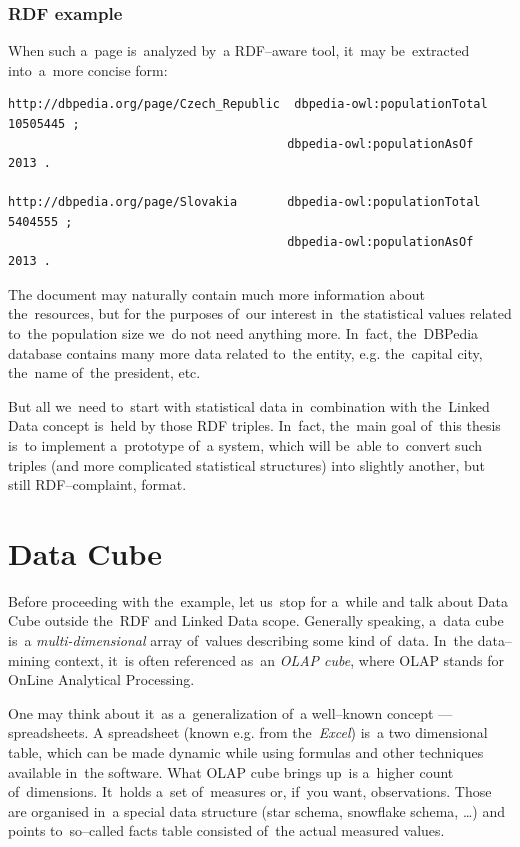 \subsubsection{RDF example}

When such a~page is~analyzed by~a RDF--aware tool, it~may be~extracted into~a~more concise form:

\scriptsize\begin{verbatim}
http://dbpedia.org/page/Czech_Republic	dbpedia-owl:populationTotal		10505445 ;
                                       dbpedia-owl:populationAsOf		2013 .

http://dbpedia.org/page/Slovakia       dbpedia-owl:populationTotal		5404555 ;
                                       dbpedia-owl:populationAsOf		2013 .
\end{verbatim}\normalsize

The document may naturally contain much more information about the~resources, but for the
purposes of~our interest in~the statistical values related to~the population size we~do not
need anything more. In~fact, the~DBPedia database contains many more data related to~the entity,
e.g. the~capital city, the~name of~the president, etc.

But all we~need to~start with statistical data in~combination with the~Linked Data concept is~held
by those RDF triples. In~fact, the~main goal of~this thesis is~to implement a~prototype of~a 
system, which will be~able to~convert such triples (and more complicated statistical structures) into
slightly another, but still RDF--complaint, format.

\section{Data Cube}
\label{sec:datacube}
Before proceeding with the~example, let us~stop for a~while and talk about Data Cube outside
the~RDF and Linked Data scope. Generally speaking, a~data cube is~a \emph{multi-dimensional}
 array of~values describing some kind of~data. In~the
data--mining context, it~is often referenced as~an \emph{OLAP cube}, where OLAP stands for OnLine
Analytical Processing.

One may think about it~as a~generalization of~a well--known concept --- spreadsheets.
A spreadsheet (known e.g. from the~\emph{Excel}) is~a two dimensional table, which can be
made dynamic while using formulas and other techniques available in~the software. What
OLAP cube brings up~is a~higher count of~dimensions. It~holds a~set of~measures or, if~you
want, observations. Those are organised in~a special data structure (star schema, snowflake
schema, …) and points to~so--called facts table consisted of~the actual measured values.

